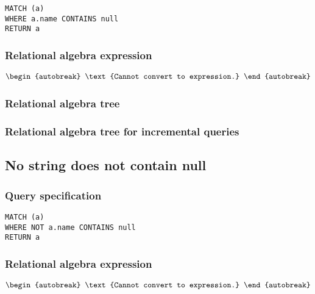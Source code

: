 \begin{lstlisting}
MATCH (a)
WHERE a.name CONTAINS null
RETURN a
\end{lstlisting}

\subsubsection*{Relational algebra expression}

\begin{align*}
\begin{autobreak}
\text{Cannot convert to expression.}
\end{autobreak}
\end{align*}

\subsubsection*{Relational algebra tree}


\subsubsection*{Relational algebra tree for incremental queries}


\subsection{No string does not contain null}

\subsubsection*{Query specification}

\begin{lstlisting}
MATCH (a)
WHERE NOT a.name CONTAINS null
RETURN a
\end{lstlisting}

\subsubsection*{Relational algebra expression}

\begin{align*}
\begin{autobreak}
\text{Cannot convert to expression.}
\end{autobreak}
\end{align*}

